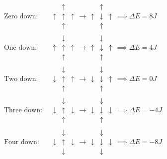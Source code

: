 \documentclass[reprint, english,notitlepage,nofootinbib]{revtex4-1}  %
\begin{document}
\begin{align*}
	\text{Zero down: } &\begin{matrix}
	& \uparrow  \\
	\uparrow & \uparrow & \uparrow \\
	& \uparrow
	\end{matrix}
	\rightarrow
	\begin{matrix}
	& \uparrow  \\
	\uparrow & \downarrow & \uparrow \\
	& \uparrow
	\end{matrix}
	\implies
	\Delta E = 8J \\
	\text{One down: }
		&\begin{matrix}
	& \downarrow  \\
	\uparrow & \uparrow & \uparrow \\
	& \uparrow
	\end{matrix}
	\rightarrow
	\begin{matrix}
	& \downarrow  \\
	\uparrow & \downarrow & \uparrow \\
	& \uparrow
	\end{matrix}
	\implies
	\Delta E = 4J \\
	\text{Two down: }
		&\begin{matrix}
	& \downarrow  \\
	\downarrow & \uparrow & \uparrow \\
	& \uparrow
	\end{matrix}
	\rightarrow
	\begin{matrix}
	& \downarrow  \\
	\downarrow & \downarrow & \uparrow \\
	& \uparrow
	\end{matrix}
	\implies
	\Delta E = 0J \\
	\text{Three down: }
		&\begin{matrix}
	& \downarrow  \\
	\downarrow & \uparrow & \downarrow \\
	& \uparrow
	\end{matrix}
	\rightarrow
	\begin{matrix}
	& \downarrow  \\
	\downarrow & \downarrow & \downarrow \\
	& \uparrow
	\end{matrix}
	\implies
	\Delta E = -4J \\
	\text{Four down: }
		&\begin{matrix}
	& \downarrow  \\
	\downarrow & \uparrow & \downarrow \\
	& \downarrow
	\end{matrix}
	\rightarrow
	\begin{matrix}
	& \downarrow  \\
	\downarrow & \downarrow & \downarrow \\
	& \downarrow
	\end{matrix}
	\implies
	\Delta E = -8J \\
\end{align*}
\end{document}
